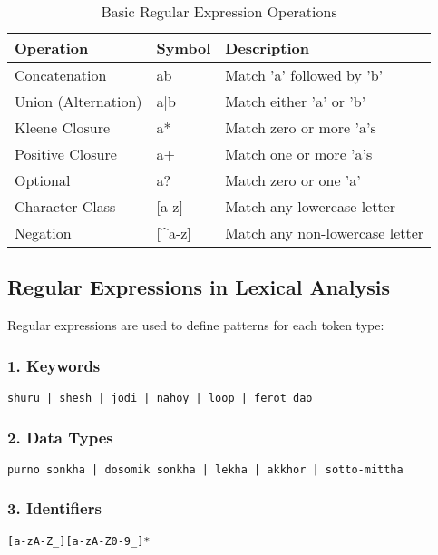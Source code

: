 \documentclass[12pt,a4paper]{article}
\begin{document}
\begin{table}[H]
\centering
\begin{tabular}{|p{3.5cm}|p{2.5cm}|p{7.5cm}|}
\hline
\rowcolor{lightgray!30}
\textbf{Operation} & \textbf{Symbol} & \textbf{Description} \\
\hline
Concatenation & ab & Match 'a' followed by 'b' \\
\hline
Union (Alternation) & a|b & Match either 'a' or 'b' \\
\hline
Kleene Closure & a* & Match zero or more 'a's \\
\hline
Positive Closure & a+ & Match one or more 'a's \\
\hline
Optional & a? & Match zero or one 'a' \\
\hline
Character Class & [a-z] & Match any lowercase letter \\
\hline
Negation & [\^{}a-z] & Match any non-lowercase letter \\
\hline
\end{tabular}
\caption{Basic Regular Expression Operations}
\end{table}

\subsection{Regular Expressions in Lexical Analysis}

Regular expressions are used to define patterns for each token type:

\subsubsection{1. Keywords}
\begin{lstlisting}
shuru | shesh | jodi | nahoy | loop | ferot dao
\end{lstlisting}

\subsubsection{2. Data Types}
\begin{lstlisting}
purno sonkha | dosomik sonkha | lekha | akkhor | sotto-mittha
\end{lstlisting}

\subsubsection{3. Identifiers}
\begin{lstlisting}
[a-zA-Z_][a-zA-Z0-9_]*
\end{lstlisting}
\end{document}
